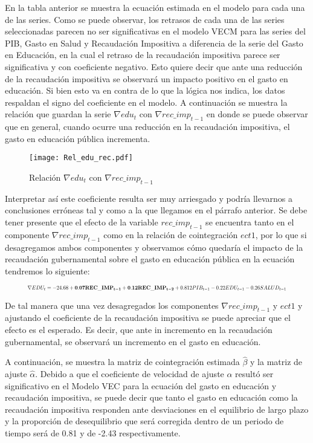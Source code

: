 En la tabla anterior se muestra la ecuación estimada en el modelo para cada una de las series. Como se puede observar, los retrasos de cada una de las series seleccionadas parecen no ser significativas en el modelo VECM para las series del PIB, Gasto en Salud y Recaudación Impositiva a diferencia de la serie del Gasto en Educación, en la cual el retraso de la recaudación impositiva parece ser significativa y con coeficiente negativo. Esto quiere decir que ante una reducción de la recaudación impositiva se observará un impacto positivo en el gasto en educación. Si bien esto va en contra de lo que la lógica nos indica, los datos respaldan el signo del coeficiente en el modelo. A continuación se muestra la relación que guardan la serie $\nabla edu_t$ con $\nabla rec\_imp_{t-1}$ en donde se puede observar que en general, cuando ocurre una reducción en la recaudación impositiva, el gasto en educación pública incrementa.


\begin{figure}[H]
\centering
\texttt{[image: Rel\_edu\_rec.pdf]}
\caption{Relación $\nabla edu_t$ con $\nabla rec\_imp_{t-1}$}
\label{rel_edu_recl}
\end{figure}

Interpretar así este coeficiente resulta ser muy arriesgado y podría llevarnos a conclusiones erróneas tal y como a la que llegamos en el párrafo anterior. Se debe tener presente que el efecto de la variable $rec\_imp_{t-1}$ se encuentra tanto en el componente $\nabla rec\_imp_{t-1}$ como en la relación de cointegración $ect1$, por lo que si desagregamos ambos componentes y observamos cómo quedaría el impacto de la recaudación gubernamental sobre el gasto en educación pública en la ecuación tendremos lo siguiente:

\begin{equation}
\resizebox{.9 \textwidth}{!} 
{
$\nabla EDU_t = -24.68 + \mathbf{0.07REC\_IMP_{t-1} + 0.12REC\_IMP_{t-2}} + 0.812PIB_{t-1} - 0.22EDU_{t-1} - 0.26SALUD_{t-1} $
}
\end{equation}

De tal manera que una vez desagregados los componentes $\nabla rec\_imp_{t-1}$ y $ect1$ y ajustando el coeficiente de la recaudación impositiva se puede apreciar que el efecto es el esperado. Es decir, que ante in incremento en la recaudación gubernamental, se observará un incremento en el gasto en educación.\bigskip 


A continuación, se muestra la matriz de cointegración estimada $\hat{\beta}$ y la matriz de ajuste $\hat{\alpha}$. Debido a que el coeficiente de velocidad de ajuste $\alpha$ resultó ser significativo en el Modelo VEC para la ecuación del gasto en educación y recaudación impositiva, se puede decir que tanto el gasto en educación como la recaudación impositiva responden ante desviaciones en el equilibrio de largo plazo y la proporción de desequilibrio que será corregida dentro de un periodo de tiempo será de 0.81 y de -2.43 respectivamente.

